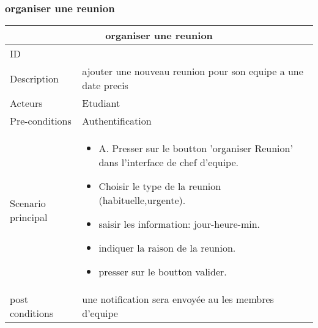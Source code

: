 \documentclass[11pt,fleqn]{book} %
\begin{document}
\subsubsection{organiser une reunion}
\begin{center}
\begin{tabularx}{1\textwidth} { | p{4cm} | >{\raggedright\arraybackslash}X |  }
  \hline
  \multicolumn{2}{|c|}{organiser une reunion} \\
 \hline
 ID & 2  \\
 \hline
 Description  & ajouter une nouveau reunion pour son equipe a une date precis \\
  \hline
 Acteurs  & Etudiant   \\
  \hline
 Pre-conditions  & Authentification\\
 \hline
 Scenario principal  &  
 \begin{itemize}
      \item A. Presser sur le boutton ’organiser Reunion’ dans l’interface de chef d’equipe.
      \item Choisir le type de la reunion (habituelle,urgente).
      \item saisir les information: jour-heure-min.
      \item indiquer la raison de la reunion.
      \item presser sur le boutton valider.

 \end{itemize}\\
  \hline
 post conditions  & une notification sera envoyée au les membres d'equipe  \\
  \hline
\end{tabularx}
\label{tbl:nicetablelesstable}
\end{center}


\end{document}
